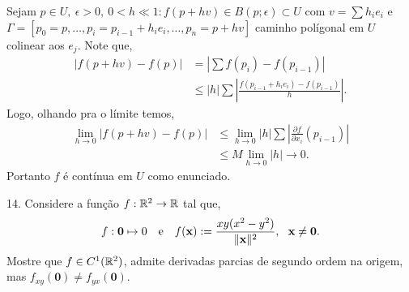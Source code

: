 \textcolor{gris}{Sejam \(p \in U, \ \epsilon >0, \ 0 < h \ll 1 : f(p+hv) \in B(p;\epsilon) \subset  U \) com \(v= \sum h_ie_i\) e \(\Gamma = [p_0 = p, \ldots, p_i = p_{i-1} + h_ie_i, \ldots, p_n = p+hv]\) caminho polígonal em \(U\) colinear aos \(e_j\). Note que,  
\begin{align*}
    |f(p+hv ) - f(p)| &= \left|\sum f(p_i) - f(p_{i-1})\right| \\
     &\leq |h| \sum \left|\frac{f(p_{i-1} + h_ie_i) - f(p_{i-1})}{h}\right|. 
\end{align*}
Logo, olhando pra o límite temos, 
\begin{align*}
    \lim_{h\to 0 } |f(p+hv) - f(p)| &\leq \lim_{h\to 0} |h| \sum \left|\frac{\partial f}{\partial x_i} (p_{i-1})\right| \\ 
    &\leq M \lim_{h\to 0} |h| \to 0.  
\end{align*}
Portanto \(f\) é contínua em \(U\) como enunciado. 
}

14. Considere a função \(f: \mathbb{R}^2 \to \mathbb{R} \) tal que, 
\[f: \textbf{0}\mapsto 0 \text{ \ \ e \ \ } f(\textbf{x}) :=  \frac{xy(x^2 - y^2)}{\|\textbf{x}\|^2}, \ \ \textbf{x} \neq \textbf{0}.\] 
Mostre que \(f \in C^1(\mathbb{R}^2)\), admite derivadas parcias de segundo ordem na origem, mas \(f_{xy}(\textbf{0}) \neq f_{yx}(\textbf{0})\). 


